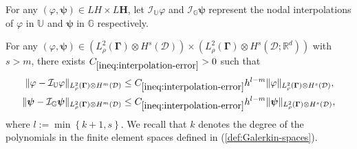\documentclass[final,onefignum,onetabnum]{mousaviart}
\begin{document}
			For any $(\varphi, \boldsymbol{\psi}) \in L H \times L \boldsymbol{H}$, let $\mathcal{I}_{\mathbb{U}} \varphi$ and $\mathcal{I}_{\mathbb{G}} \boldsymbol{\psi}$ represent the nodal interpolations of $\varphi$ in $\mathbb{U}$ and $\boldsymbol{\psi}$ in $\mathbb{G}$ respectively.
			
			\vspace*{1mm}
			\begin{lemma}
				\label{lem:interpolation-error}
				For any $(\varphi, \boldsymbol{\psi}) \in \left( L^2_{\rho}(\boldsymbol{\Gamma}) \otimes H^s (\mathcal{D}) \right) \times \left( L^2_{\rho}(\boldsymbol{\Gamma}) \otimes H^s (\mathcal{D}; \mathbb{R}^d) \right) $ with $s>m$, there exists $C_{\ref{ineq:interpolation-error}}>0$ such that
				\begin{equation}
					\begin{split}
						\label{ineq:interpolation-error}
						\lVert \varphi - \mathcal{I}_{\mathbb{U}} \varphi \rVert_{L^2_{\rho}(\boldsymbol{\Gamma}) \otimes H^m(\mathcal{D})} 
						&\leq
						C_{\ref{ineq:interpolation-error}}h^{l - m} \lVert \varphi \rVert_{L^2_{\rho}(\boldsymbol{\Gamma}) \otimes H^s(\mathcal{D})},
						\\
						\lVert \boldsymbol{\psi} - \mathcal{I}_{\mathbb{G}} \boldsymbol{\psi} \rVert_{L^2_{\rho}(\boldsymbol{\Gamma}) \otimes H^m(\mathcal{D})} 
						&\leq
						C_{\ref{ineq:interpolation-error}}h^{l - m} \lVert \boldsymbol{\psi} \rVert_{L^2_{\rho}(\boldsymbol{\Gamma}) \otimes H^s(\mathcal{D})},
					\end{split}
				\end{equation}
				where $l:= \min\left\lbrace k+1 , s\right\rbrace $. We recall that $k$ denotes the degree of the polynomials in the finite element spaces defined in (\ref{def:Galerkin-spaces}).
			\end{lemma}
			
\end{document}
